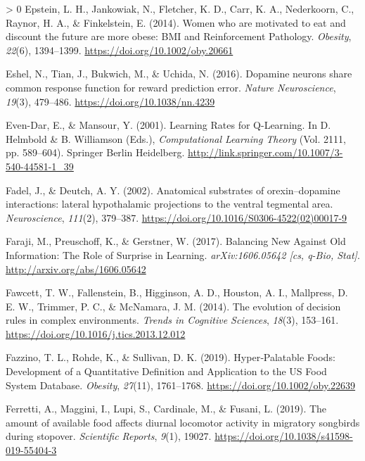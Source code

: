 \documentclass[
]{/home/nicoluarte/Downloads/templates/PNAS-template-main.tex}
\newlength{\cslhangindent}
\newenvironment{CSLReferences}[3] %
 {%
  \setlength{\parindent}{0pt}
  \ifodd #1 \everypar{\setlength{\hangindent}{\cslhangindent}}\ignorespaces\fi
  \ifnum #2 > 0
  \setlength{\parskip}{#2\baselineskip}
  \fi
 }%
 {}
\begin{document}
\begin{CSLReferences}{1}{0}
\leavevmode\hypertarget{ref-TLRSYNN6}{}%
Epstein, L. H., Jankowiak, N., Fletcher, K. D., Carr, K. A., Nederkoorn,
C., Raynor, H. A., \& Finkelstein, E. (2014). Women who are motivated to
eat and discount the future are more obese: BMI and Reinforcement
Pathology. \emph{Obesity}, \emph{22}(6), 1394--1399.
\url{https://doi.org/10.1002/oby.20661}

\leavevmode\hypertarget{ref-R775Y2Q6}{}%
Eshel, N., Tian, J., Bukwich, M., \& Uchida, N. (2016). Dopamine neurons
share common response function for reward prediction error. \emph{Nature
Neuroscience}, \emph{19}(3), 479--486.
\url{https://doi.org/10.1038/nn.4239}

\leavevmode\hypertarget{ref-89DIP32B}{}%
Even-Dar, E., \& Mansour, Y. (2001). Learning Rates for Q-Learning. In
D. Helmbold \& B. Williamson (Eds.), \emph{Computational Learning
Theory} (Vol. 2111, pp. 589--604). Springer Berlin Heidelberg.
\url{http://link.springer.com/10.1007/3-540-44581-1_39}

\leavevmode\hypertarget{ref-4PLXQQT9}{}%
Fadel, J., \& Deutch, A. Y. (2002). Anatomical substrates of
orexin--dopamine interactions: lateral hypothalamic projections to the
ventral tegmental area. \emph{Neuroscience}, \emph{111}(2), 379--387.
\url{https://doi.org/10.1016/S0306-4522(02)00017-9}

\leavevmode\hypertarget{ref-Q3Q977MQ}{}%
Faraji, M., Preuschoff, K., \& Gerstner, W. (2017). Balancing New
Against Old Information: The Role of Surprise in Learning.
\emph{arXiv:1606.05642 {[}cs, q-Bio, Stat{]}}.
\url{http://arxiv.org/abs/1606.05642}

\leavevmode\hypertarget{ref-WS9KYIYG}{}%
Fawcett, T. W., Fallenstein, B., Higginson, A. D., Houston, A. I.,
Mallpress, D. E. W., Trimmer, P. C., \& McNamara, J. M. (2014). The
evolution of decision rules in complex environments. \emph{Trends in
Cognitive Sciences}, \emph{18}(3), 153--161.
\url{https://doi.org/10.1016/j.tics.2013.12.012}

\leavevmode\hypertarget{ref-NBA5EBE8}{}%
Fazzino, T. L., Rohde, K., \& Sullivan, D. K. (2019). Hyper‐Palatable
Foods: Development of a Quantitative Definition and Application to the
US Food System Database. \emph{Obesity}, \emph{27}(11), 1761--1768.
\url{https://doi.org/10.1002/oby.22639}

\leavevmode\hypertarget{ref-B3IPWFXL}{}%
Ferretti, A., Maggini, I., Lupi, S., Cardinale, M., \& Fusani, L.
(2019). The amount of available food affects diurnal locomotor activity
in migratory songbirds during stopover. \emph{Scientific Reports},
\emph{9}(1), 19027. \url{https://doi.org/10.1038/s41598-019-55404-3}


\end{CSLReferences}
\end{document}
